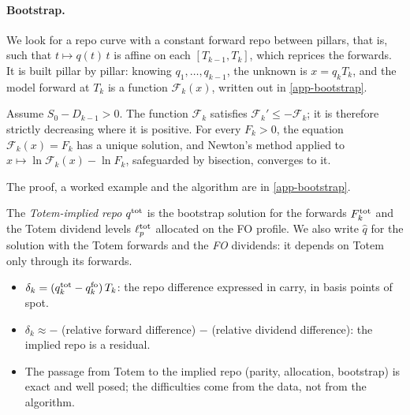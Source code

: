 \paragraph{Bootstrap.} We look for a repo curve with a constant forward repo between pillars, that is, such that
$t\mapsto q(t)\,t$ is affine on each $[T_{k-1}, T_k]$, which reprices the forwards. It is built pillar by pillar:
knowing $q_1, \dots, q_{k-1}$, the unknown is $x=q_kT_k$, and the model forward at $T_k$ is a function
$\mathcal F_k(x)$, written out in \cref{app-bootstrap}.

\begin{proposition}\label{prop-bootstrap}
Assume $S_0-D_{k-1}>0$. The function $\mathcal F_k$ satisfies $\mathcal F_k'\le-\mathcal F_k$; it is therefore
strictly decreasing where it is positive. For every $F_k>0$, the equation $\mathcal F_k(x)=F_k$ has a unique solution,
and Newton's method applied to $x\mapsto\ln\mathcal F_k(x)-\ln F_k$, safeguarded by bisection, converges to it.
\end{proposition}
The proof, a worked example and the algorithm are in \cref{app-bootstrap}.

\begin{definition}\label{def-implied}
The \emph{Totem-implied repo} $q^{\mathrm{tot}}$ is the bootstrap solution for the forwards $F^{\mathrm{tot}}_k$ and the Totem
dividend levels $\ell^{\mathrm{tot}}_p$ allocated on the FO profile. We also write $\hat q$ for the solution with the Totem
forwards and the \emph{FO} dividends: it depends on Totem only through its forwards.
\end{definition}

\begin{retenir}
\begin{itemize}[leftmargin=12pt]
\item $\delta_k=(q^{\mathrm{tot}}_k-q^{\mathrm{fo}}_k)\,T_k$: the repo difference expressed in carry, in basis points of spot.
\item $\delta_k\approx-$ (relative forward difference) $-$ (relative dividend difference): the implied repo is a
residual.
\item The passage from Totem to the implied repo (parity, allocation, bootstrap) is exact and well posed; the
difficulties come from the data, not from the algorithm.
\end{itemize}
\end{retenir}

